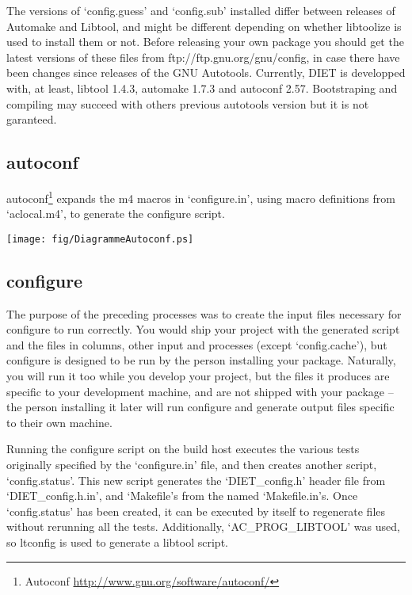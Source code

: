 The versions of `config.guess' and `config.sub' installed differ between 
releases of Automake and Libtool, and might be different depending on whether 
libtoolize is used to install them or not. Before releasing your own package 
you should get the latest versions of these files from ftp://ftp.gnu.org/gnu/config,
in case there have been changes since releases of the GNU Autotools.
Currently, DIET is developped with, at least, libtool 1.4.3, automake 1.7.3 and 
autoconf 2.57. Bootstraping and compiling may succeed with others previous autotools version
but it is not garanteed.


\subsection{autoconf}
autoconf\footnote{Autoconf {\url{http://www.gnu.org/software/autoconf/}}} expands the m4 macros in `configure.in', using macro 
definitions from `aclocal.m4', to generate the configure script.
\begin{center}
\texttt{[image: fig/DiagrammeAutoconf.ps]}
\end{center}

\subsection{configure}
The purpose of the preceding processes was to create the input files necessary
for configure to run correctly. You would ship your project with the generated
script and the files in columns, other input and processes (except 
`config.cache'), but configure is designed to be run by the person installing
your package. Naturally, you will run it too while you develop your project,
but the files it produces are specific to your development machine, and are
not shipped with your package -- the person installing it later will run 
configure and generate output files specific to their own machine.

Running the configure script on the build host executes the various tests 
originally specified by the `configure.in' file, and then creates another script,
`config.status'. This new script generates the `DIET\_config.h' header file from 
`DIET\_config.h.in', and `Makefile's from the named `Makefile.in's. Once 
`config.status' has been created, it can be executed by itself to regenerate
files without rerunning all the tests. Additionally, `AC\_PROG\_LIBTOOL'
was used, so ltconfig is used to generate a libtool script. 


